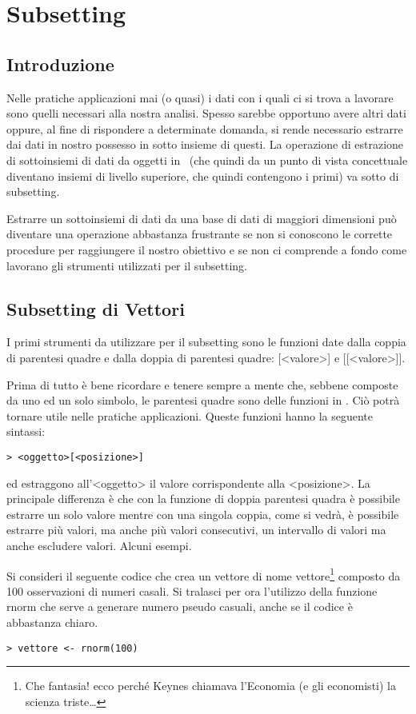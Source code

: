 \chapter{Subsetting}
\section{Introduzione}

Nelle pratiche applicazioni mai (o quasi) i dati con i quali ci si trova a lavorare sono quelli necessari alla nostra analisi. Spesso sarebbe opportuno avere altri dati oppure, al fine di rispondere a determinate domanda, si rende necessario estrarre dai dati in nostro possesso in sotto insieme di questi. La operazione di estrazione di sottoinsiemi di dati da oggetti in \erre\ (che quindi da un punto di vista concettuale diventano insiemi di livello superiore, che quindi contengono i primi) va sotto di subsetting.

Estrarre un sottoinsiemi di dati da una base di dati di maggiori dimensioni può diventare una operazione abbastanza frustrante se non si conoscono le corrette procedure per raggiungere il nostro obiettivo e se non ci comprende a fondo come lavorano gli strumenti utilizzati per il subsetting.

\section{Subsetting di Vettori}
I primi strumenti da utilizzare per il subsetting sono le funzioni date dalla coppia di parentesi quadre e dalla doppia di parentesi quadre: [<valore>] e [[<valore>]].

Prima di tutto è bene ricordare e tenere sempre a mente che, sebbene composte da uno ed un solo simbolo, le parentesi quadre sono delle funzioni in \erre. Ciò potrà tornare utile nelle pratiche applicazioni. Queste funzioni hanno la seguente sintassi:
\begin{lstlisting}
> <oggetto>[<posizione>]
\end{lstlisting}
ed  estraggono all'<oggetto> il valore corrispondente alla <posizione>. La principale differenza è che con la funzione di doppia parentesi quadra è possibile estrarre un solo valore mentre con una singola coppia, come si vedrà, è possibile estrarre più valori, ma anche più valori consecutivi, un intervallo di valori ma anche escludere valori. Alcuni esempi.

Si consideri il seguente codice che crea un vettore di nome \textsf{vettore}\footnote{Che fantasia! ecco perché Keynes chiamava l'Economia (e gli economisti) la scienza triste\dots} composto da 100 osservazioni di numeri casali. Si tralasci per ora l'utilizzo della funzione \textsf{rnorm} che serve a generare numero pseudo casuali, anche se il codice è abbastanza chiaro.
\begin{lstlisting}
> vettore <- rnorm(100)
\end{lstlisting}

